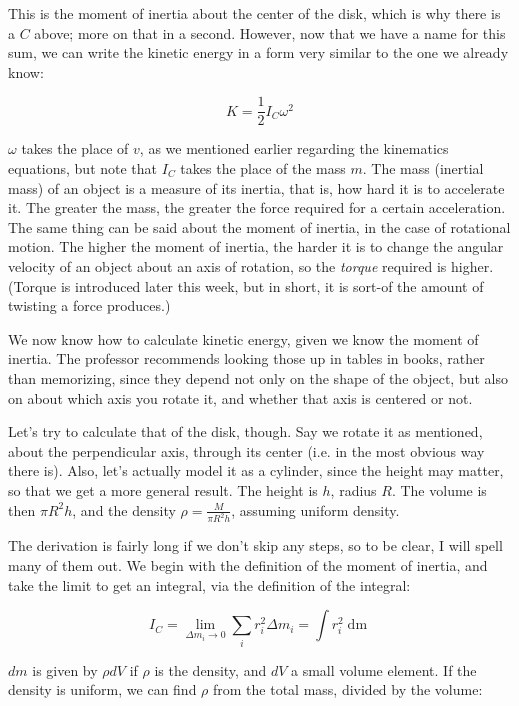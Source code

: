 \documentclass[8.01x]{subfiles}
\begin{document}
This is the moment of inertia about the center of the disk, which is why there is a $C$ above; more on that in a second. However, now that we have a name for this sum, we can write the kinetic energy in a form very similar to the one we already know:

\begin{equation}
K = \frac{1}{2} I_C \omega^2
\end{equation}

$\omega$ takes the place of $v$, as we mentioned earlier regarding the kinematics equations, but note that $I_C$ takes the place of the mass $m$. The mass (inertial mass) of an object is a measure of its inertia, that is, how hard it is to accelerate it. The greater the mass, the greater the force required for a certain acceleration.\\
The same thing can be said about the moment of inertia, in the case of rotational motion. The higher the moment of inertia, the harder it is to change the angular velocity of an object about an axis of rotation, so the \emph{torque} required is higher. (Torque is introduced later this week, but in short, it is sort-of the amount of twisting a force produces.)

We now know how to calculate kinetic energy, given we know the moment of inertia. The professor recommends looking those up in tables in books, rather than memorizing, since they depend not only on the shape of the object, but also on about which axis you rotate it, and whether that axis is centered or not.

Let's try to calculate that of the disk, though. Say we rotate it as mentioned, about the perpendicular axis, through its center (i.e. in the most obvious way there is). Also, let's actually model it as a cylinder, since the height may matter, so that we get a more general result. The height is $h$, radius $R$. The volume is then $\pi R^2 h$, and the density $\displaystyle \rho = \frac{M}{\pi R^2 h}$, assuming uniform density.

The derivation is fairly long if we don't skip any steps, so to be clear, I will spell many of them out. We begin with the definition of the moment of inertia, and take the limit to get an integral, via the definition of the integral:

\begin{equation}
I_C = \lim_{\Delta m_i \to 0} \sum_i r_i^2 \Delta m_i = \int r_i^2 \mathop{dm}
\end{equation}

$dm$ is given by $\rho dV$ if $\rho$ is the density, and $dV$ a small volume element. If the density is uniform, we can find $\rho$ from the total mass, divided by the volume:
\end{document}
